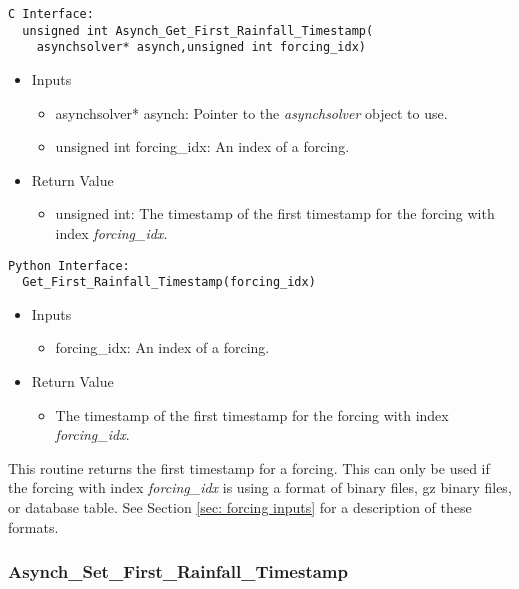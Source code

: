 \documentclass[12pt]{article}
\begin{document}
\begin{lstlisting}[style=CStyle]
  C Interface:
  unsigned int Asynch_Get_First_Rainfall_Timestamp(
    asynchsolver* asynch,unsigned int forcing_idx)
\end{lstlisting}
\begin{itemize}
 \item Inputs
  \begin{itemize}
   \item asynchsolver* asynch: Pointer to the \emph{asynchsolver} object to use.
   \item unsigned int forcing\_idx: An index of a forcing.
  \end{itemize}
 \item Return Value
  \begin{itemize}
   \item unsigned int: The timestamp of the first timestamp for the forcing with index \emph{forcing\_idx}.
  \end{itemize}
\end{itemize}
\begin{lstlisting}[style=PythonStyle]
  Python Interface:
  Get_First_Rainfall_Timestamp(forcing_idx)
\end{lstlisting}
\begin{itemize}
 \item Inputs
  \begin{itemize}
   \item forcing\_idx: An index of a forcing.
  \end{itemize}
 \item Return Value
  \begin{itemize}
   \item The timestamp of the first timestamp for the forcing with index \emph{forcing\_idx}.
  \end{itemize}
\end{itemize}
This routine returns the first timestamp for a forcing. This can only be used if the forcing with index \emph{forcing\_idx} is using a format of binary files, gz binary files, or database table. See Section \ref{sec: forcing inputs} for a description of these formats.


\subsubsection{Asynch\_Set\_First\_Rainfall\_Timestamp} \label{sec: asynch_set_first_rainfall_timestamp}
\end{document}

